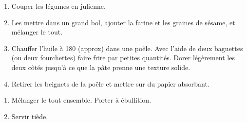 \label{かき揚げ}


\begin{ingredients}
\end{ingredients}

\begin{recipe}
  \begin{enumerate}

  \item Couper les légumes en julienne.
    
  \item Les mettre dans un grand bol, ajouter la farine et les graines
    de sésame, et mélanger le tout.
    
  \item Chauffer l'huile à 180\degreeC{} (approx) dans une poêle.  Avec
    l'aide de deux baguettes (ou deux fourchettes) faire frire par
    petites quantités.  Dorer légèrement les deux côtés jusqu'à ce que
    la pâte prenne une texture solide.
    
  \item Retirer les beignets de la poêle et mettre sur du papier
    absorbant.

  \end{enumerate}
\end{recipe}


\begin{ingredients}
\end{ingredients}

\begin{recipe}
  \begin{enumerate}
  \item Mélanger le tout ensemble.  Porter à ébullition.
  \item Servir tiède.
  \end{enumerate}
\end{recipe}

